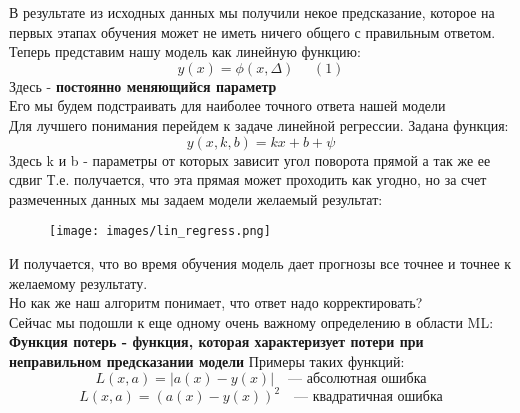 \usetikzlibrary{shapes.geometric, arrows.meta}



\begin{center}
\end{center}

В результате из исходных данных мы получили некое предсказание, которое на первых этапах обучения может не иметь ничего общего с правильным ответом. \\
\vspace{1cm}
    Теперь представим нашу модель как линейную функцию:
    \[y(x) = \phi (x, \Delta)  \ \ \ \ \ \  (1)\]
    Здесь \Delta - \textbf{постоянно меняющийся параметр} \\
    Его мы будем подстраивать для наиболее точного ответа нашей модели \\
    \vspace{1cm}
    Для лучшего понимания перейдем к задаче линейной регрессии.
    Задана функция:
    \[
        y(x, k, b) = kx + b + \psi
    \]
    Здесь k и b - параметры от которых зависит угол поворота прямой а так же ее сдвиг
    Т.е. получается, что эта прямая может проходить как угодно, но за счет размеченных данных мы задаем модели желаемый результат:

\begin{figure}[htbp]
        \centering
        \texttt{[image: images/lin\_regress.png]}
        \label{fig:example}
    \end{figure}
    И получается, что во время обучения модель дает прогнозы все точнее и точнее к желаемому результату. \\
    \vspace{1cm}
    Но как же наш алгоритм понимает, что ответ надо корректировать?\\
    Сейчас мы подошли к еще одному очень важному определению в области ML: \\
    \vspace{0.8cm}
    \textbf{Функция потерь - функция, которая характеризует потери при неправильном предсказании модели}
    Примеры таких функций:
    \[
    L(x, a) = |a(x) - y(x)| \quad \text{— абсолютная ошибка}
\]
\[
    L(x, a) = (a(x) - y(x))^2 \quad \text{— квадратичная ошибка}
\]

